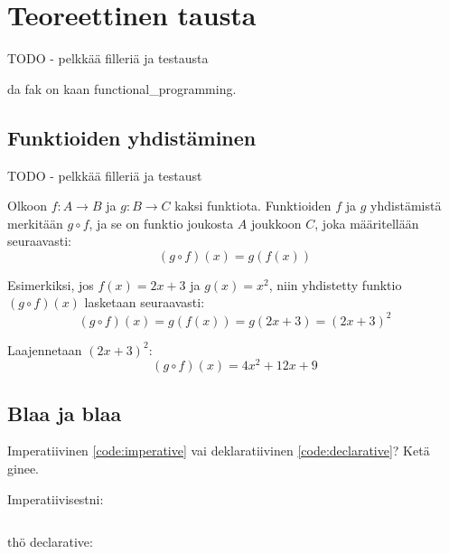 \vspace{21.5pt} %
\chapter{Teoreettinen tausta}

TODO - pelkkää filleriä ja testausta

da fak on kaan \gls{functional_programming}.

\section{Funktioiden yhdistäminen}

TODO - pelkkää filleriä ja testaust

Olkoon \( f: A \rightarrow B \) ja \( g: B \rightarrow C \) kaksi funktiota. Funktioiden \( f \) ja \( g \) yhdistämistä merkitään \( g \circ f \), ja se on funktio joukosta \( A \) joukkoon \( C \), joka määritellään seuraavasti:
\[
  (g \circ f)(x) = g(f(x))
\]

Esimerkiksi, jos \( f(x) = 2x + 3 \) ja \( g(x) = x^2 \), niin yhdistetty funktio \( (g \circ f)(x) \) lasketaan seuraavasti:
\[
  (g \circ f)(x) = g(f(x)) = g(2x + 3) = (2x + 3)^2
\]

Laajennetaan \( (2x + 3)^2 \):
\[
  (g \circ f)(x) = 4x^2 + 12x + 9
\]

\section{Blaa ja blaa}

Imperatiivinen \ref{code:imperative} vai deklaratiivinen \ref{code:declarative}? Ketä ginee.

Imperatiivisestni:

\begin{code}
  \inputminted{javascript}{code/imperative.js}
  \label{code:imperative}
\end{code}

thö declarative:

\begin{code}
  \inputminted{javascript}{code/declarative.js}
  \label{code:declarative}
\end{code}


